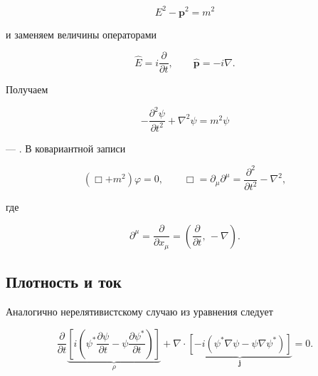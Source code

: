 \documentclass[../final.tex]{subfiles}
\begin{document}
\begin{equation*}
    E^2-\mathbf p^2=m^2
\end{equation*}

и заменяем величины операторами

\begin{equation*}
    \hat E=i\frac{\partial}{\partial t},
    \qquad
    \hat{\mathbf p}=-i\nabla.
\end{equation*}

Получаем

\begin{equation*}
    -\frac{\partial^2\psi}{\partial t^2}
    +
    \nabla^2\psi
    =
    m^2\psi
\end{equation*}

--- . В ковариантной записи

\begin{equation*}
    \left(\Box+m^2\right)\varphi=0,
    \qquad
    \Box
    =
    \partial_\mu\partial^\mu
    =
    \frac{\partial^2}{\partial t^2}-\nabla^2,
\end{equation*}

где

\begin{equation*}
    \partial^\mu
    =
    \frac{\partial}{\partial x_\mu}
    =
    \left(
        \frac{\partial}{\partial t},\,
        -\nabla
    \right).
\end{equation*}


\subsection{Плотность и ток}

Аналогично нерелятивистскому случаю из уравнения следует

\begin{equation*}
    \frac{\partial}{\partial t}
    \underbrace{
        \left[
            i\left(
                \psi^*\frac{\partial\psi}{\partial t}
                -
                \psi\frac{\partial\psi^*}{\partial t}
            \right)
        \right]
    }_{\rho}
    +
    \nabla\cdot
    \underbrace{
        \left[
            -i\left(
                \psi^*\nabla\psi
                -
                \psi\nabla\psi^*
            \right)
        \right]
    }_{\mathbf j}
    =
    0.
\end{equation*}
\end{document}
